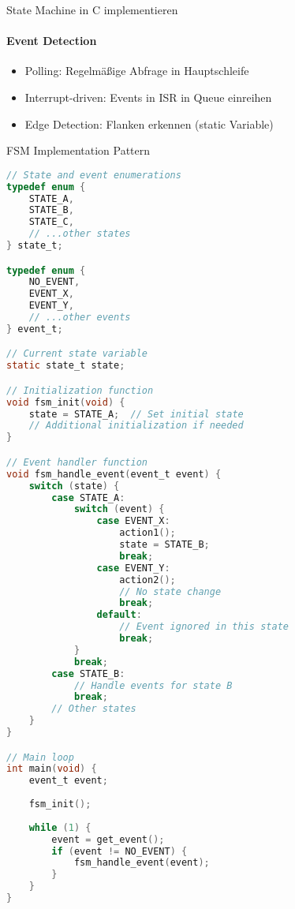 \begin{KR}{State Machine in C implementieren}
\paragraph{Event Detection}
    \begin{itemize}
        \item Polling: Regelmäßige Abfrage in Hauptschleife
        \item Interrupt-driven: Events in ISR in Queue einreihen
        \item Edge Detection: Flanken erkennen (static Variable)
    \end{itemize}
\end{KR}

\begin{code}{FSM Implementation Pattern}
\begin{lstlisting}[language=C, style=basesmol]
// State and event enumerations
typedef enum {
    STATE_A,
    STATE_B,
    STATE_C,
    // ...other states
} state_t;

typedef enum {
    NO_EVENT,
    EVENT_X,
    EVENT_Y,
    // ...other events
} event_t;

// Current state variable
static state_t state;

// Initialization function
void fsm_init(void) {
    state = STATE_A;  // Set initial state
    // Additional initialization if needed
}

// Event handler function
void fsm_handle_event(event_t event) {
    switch (state) {
        case STATE_A:
            switch (event) {
                case EVENT_X:
                    action1();
                    state = STATE_B;
                    break;
                case EVENT_Y:
                    action2();
                    // No state change
                    break;
                default:
                    // Event ignored in this state
                    break;
            }
            break;
        case STATE_B:
            // Handle events for state B
            break;
        // Other states
    }
}

// Main loop
int main(void) {
    event_t event;
    
    fsm_init();
    
    while (1) {
        event = get_event();
        if (event != NO_EVENT) {
            fsm_handle_event(event);
        }
    }
}
\end{lstlisting}
\end{code}










